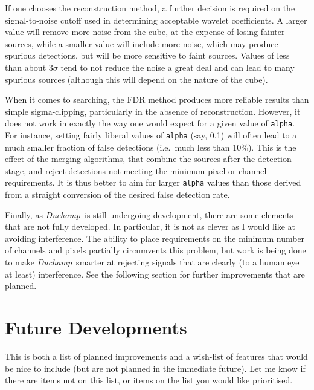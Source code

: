 \documentclass[12pt,a4paper]{article}
\newcommand{\ie}{i.e.\ }
\newcommand{\duchamp}{\emph{Duchamp}}
\begin{document}
If one chooses the reconstruction method, a further decision is
required on the signal-to-noise cutoff used in determining acceptable
wavelet coefficients. A larger value will remove more noise from the
cube, at the expense of losing fainter sources, while a smaller value
will include more noise, which may produce spurious detections, but
will be more sensitive to faint sources. Values of less than about
$3\sigma$ tend to not reduce the noise a great deal and can lead to
many spurious sources (although this will depend on the nature of the
cube).

When it comes to searching, the FDR method produces more reliable results 
than simple sigma-clipping, particularly in the absence of reconstruction. 
However, it does not work in exactly the way one would expect for a 
given value of \texttt{alpha}. For instance, setting fairly liberal values 
of \texttt{alpha} (say, 0.1) will often lead to a much smaller fraction 
of false detections (\ie much less than 10\%). This is the effect of the 
merging algorithms, that combine the sources after the detection stage,  
and reject detections not meeting the minimum pixel or channel requirements. 
It is thus better to aim for larger \texttt{alpha} values than those derived
from a straight conversion of the desired false detection rate.

Finally, as \duchamp\ is still undergoing development, there are some
elements that are not fully developed. In particular, it is not as
clever as I would like at avoiding interference. The ability to place
requirements on the minimum number of channels and pixels partially
circumvents this problem, but work is being done to make \duchamp\
smarter at rejecting signals that are clearly (to a human eye at
least) interference. See the following section for further
improvements that are planned.

\section{Future Developments}

This is both a list of planned improvements and a wish-list of
features that would be nice to include (but are not planned in the
immediate future). Let me know if there are items not on this list, or
items on the list you would like prioritised.
\end{document}
